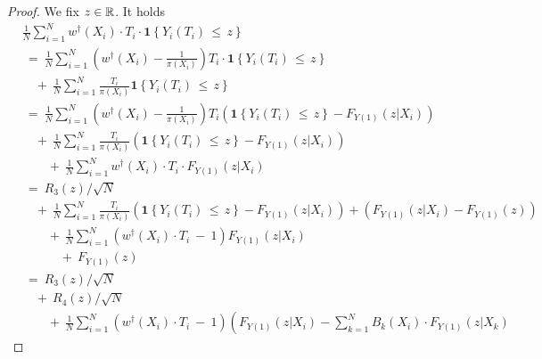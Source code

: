 \begin{proof}
  We fix $z\in\mathbb{R}$.
  It holds
  \begin{align*}
    &
    \frac{1}{N}
    \sum_{i=1}^{N} 
    w^\dagger(X_i)
    \cdot
    T_i
    \cdot
    \mathbf{1}{\left\{ Y_i(T_i)\, \le\, z \right\}}
    \\
    &
    \ 
    =
    \ 
    \frac{1}{N}
    \sum_{i=1}^{N} 
    \left( 
    w^\dagger(X_i)
    -
    \frac{1}{\pi(X_i)}
    \right)
    T_i
    \cdot
    \mathbf{1}{\left\{ Y_i(T_i)\, \le\, z \right\}}
    \\
    &
    \quad 
    +
    \ 
    \frac{1}{N}
    \sum_{i=1}^{N} 
    \frac{T_i}{\pi(X_i)}
    \mathbf{1}{\left\{ Y_i(T_i)\, \le\, z \right\}}
    \\
    &
    \ 
    =
    \ 
    \frac{1}{N}
    \sum_{i=1}^{N} 
    \left( 
    w^\dagger(X_i)
    -
    \frac{1}{\pi(X_i)}
    \right)
    T_i
    \left( 
    \mathbf{1}{\left\{ Y_i(T_i)\, \le\, z \right\}}
    -
    F_{Y(1)}(z|X_i)
    \right)
    \\
    &
    \quad 
    +
    \ 
    \frac{1}{N}
    \sum_{i=1}^{N} 
    \frac{T_i}{\pi(X_i)}
    \left( 
    \mathbf{1}{\left\{ Y_i(T_i)\, \le\, z \right\}}
    -
    F_{Y(1)}(z|X_i)
    \right)
    \\
    &
    \qquad 
    +
    \ 
    \frac{1}{N}
    \sum_{i=1}^{N} 
    w^\dagger(X_i)\cdot T_i\cdot
    F_{Y(1)}(z|X_i)
    \\
    &
    \ 
    =
    \ 
    R_3(z)/\sqrt{N}
    \\
    &
    \quad 
    +
    \ 
    \frac{1}{N}
    \sum_{i=1}^{N} 
    \frac{T_i}{\pi(X_i)}
    \left( 
    \mathbf{1}{\left\{ Y_i(T_i)\, \le\, z \right\}}
    -
    F_{Y(1)}(z|X_i)
    \right)
    +
    \left( 
    F_{Y(1)}(z|X_i)
    -
    F_{Y(1)}(z)
    \right)
    \\
    &
    \qquad
    +
    \ 
    \frac{1}{N}
    \sum_{i=1}^{N} 
    \left( 
    w^\dagger(X_i)\cdot T_i
    \ 
    -
    \ 
    1
    \right)
    F_{Y(1)}(z|X_i)
    \\
    &
    \quad\qquad
    +
    \ 
    F_{Y(1)}(z)
    \\
    &
    \ 
    =
    \ 
    R_3(z)/\sqrt{N}
    \\
    &
    \quad
    +
    \ 
    R_4(z)/\sqrt{N}
    \\
    &
    \qquad
    +
    \ 
    \frac{1}{N}
    \sum_{i=1}^{N} 
    \left( 
    w^\dagger(X_i)\cdot T_i
    \ 
    -
    \ 
    1
    \right)
    \left( 
    F_{Y(1)}(z|X_i)
    -
    \sum_{k=1}^{N} 
    B_k(X_i)
    \cdot
  F_{Y(1)}(z|X_k)

\end{align*}
\end{proof}
